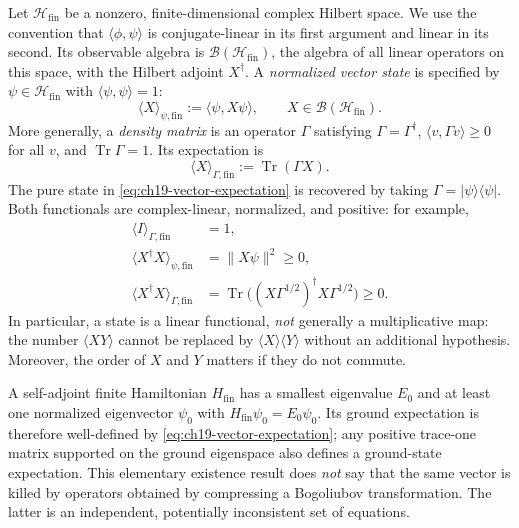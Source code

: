 Let $\mathcal H_{\mathrm{fin}}$ be a nonzero, finite-dimensional complex
Hilbert space.  We use the convention that $\langle\phi,\psi\rangle$ is
conjugate-linear in its first argument and linear in its second.  Its
observable algebra is $\mathcal B(\mathcal H_{\mathrm{fin}})$, the algebra of
all linear operators on this space, with the Hilbert adjoint $X^\dagger$.
A \emph{normalized vector state} is specified by
$\psi\in\mathcal H_{\mathrm{fin}}$ with $\langle\psi,\psi\rangle=1$:
\begin{equation}
  \langle X\rangle_{\psi,\mathrm{fin}}
   :=\langle\psi,X\psi\rangle,
  \qquad X\in\mathcal B(\mathcal H_{\mathrm{fin}}).
  \label{eq:ch19-vector-expectation}
\end{equation}
More generally, a \emph{density matrix} is an operator $\Gamma$ satisfying
$\Gamma=\Gamma^\dagger$, $\langle v,\Gamma v\rangle\geq0$ for all $v$,
and $\operatorname{Tr}\Gamma=1$.  Its expectation is
\begin{equation}
  \langle X\rangle_{\Gamma,\mathrm{fin}}
     :=\operatorname{Tr}(\Gamma X).
  \label{eq:ch19-density-expectation}
\end{equation}
The pure state in \eqref{eq:ch19-vector-expectation} is recovered by taking
$\Gamma=|\psi\rangle\langle\psi|$.  Both functionals are complex-linear,
normalized, and positive: for example,
\begin{align}
  \langle I\rangle_{\Gamma,\mathrm{fin}}&=1,\\
  \langle X^\dagger X\rangle_{\psi,\mathrm{fin}}
    &=\|X\psi\|^2\geq0,\\
  \langle X^\dagger X\rangle_{\Gamma,\mathrm{fin}}
    &=\operatorname{Tr}\bigl((X\Gamma^{1/2})^\dagger
                                  X\Gamma^{1/2}\bigr)\geq0.
  \label{eq:ch19-finite-positivity}
\end{align}
In particular, a state is a linear functional, \emph{not} generally a
multiplicative map: the number $\langle XY\rangle$ cannot be replaced by
$\langle X\rangle\langle Y\rangle$ without an additional hypothesis.
Moreover, the order of $X$ and $Y$ matters if they do not commute.

A self-adjoint finite Hamiltonian $H_{\mathrm{fin}}$ has a smallest
eigenvalue $E_0$ and at least one normalized eigenvector $\psi_0$ with
$H_{\mathrm{fin}}\psi_0=E_0\psi_0$.  Its ground expectation is therefore
well-defined by \eqref{eq:ch19-vector-expectation}; any positive trace-one
matrix supported on the ground eigenspace also defines a ground-state
expectation.  This elementary existence result does \emph{not} say that the
same vector is killed by operators obtained by compressing a Bogoliubov
transformation.  The latter is an independent, potentially inconsistent set
of equations.


